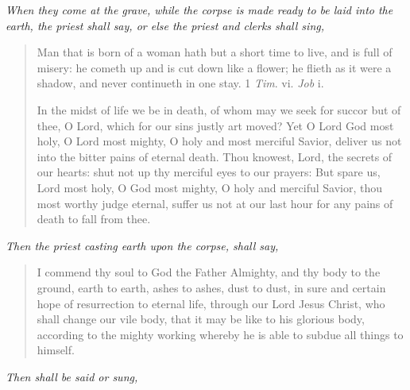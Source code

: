 \documentclass[
]{book}
\begin{document}
\begin{center}
\emph{When they come at the grave, while the corpse is made ready to be laid into the earth, the priest shall say, or else the priest and clerks shall sing,}

\end{center}

\begin{quote}
Man that is born of a woman hath but a short time to live, and is full of misery: he cometh up and is cut down like a flower; he flieth as it were a shadow, and never continueth in one stay. 1 \emph{Tim}. vi. \emph{Job} i.

In the midst of life we be in death, of whom may we seek for succor but of thee, O Lord, which for our sins justly art moved? Yet O Lord God most holy, O Lord most mighty, O holy and most merciful Savior, deliver us not into the bitter pains of eternal death. Thou knowest, Lord, the secrets of our hearts: shut not up thy merciful eyes to our prayers: But spare us, Lord most holy, O God most mighty, O holy and merciful Savior, thou most worthy judge eternal, suffer us not at our last hour for any pains of death to fall from thee.
\end{quote}

\begin{center}
\emph{Then the priest casting earth upon the corpse, shall say,}

\end{center}

\begin{quote}
I commend thy soul to God the Father Almighty, and thy body to the ground, earth to earth, ashes to ashes, dust to dust, in sure and certain hope of resurrection to eternal life, through our Lord Jesus Christ, who shall change our vile body, that it may be like to his glorious body, according to the mighty working whereby he is able to subdue all things to himself.
\end{quote}

\begin{center}
\emph{Then shall be said or sung,}

\end{center}
\end{document}
